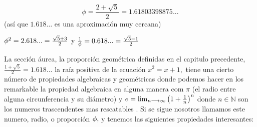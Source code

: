 $$\phi=\frac{2+\sqrt{5}}{2}=1.61803398875...$$
(así que $1.618\ldots $ es una aproximación  muy cercana)

$\phi^2=2.618...=\frac{\sqrt{5}+3}{2}$ y
$\frac{1}{\phi}=0.618...=\frac{\sqrt{5}-1}{2}$


La sección áurea, la proporción geométrica definidas en el capitulo precedente, $\frac{1+\sqrt{5}}{2}=1.618...$ la raíz positiva de la ecuación $x^2=x+1,$ tiene una cierto número de propiedades  algebraicas  y geométricas   donde podemos hacer en los remarkable la propiedad algebraica  en alguna manera  com $\pi$ (el radio entre alguna circunferencia y su diámetro) y $e=\lim_{n\longrightarrow \infty}\left(1+\frac{1}{n}\right)^n$ donde $n\in \mathbb{N}$ son los numeros trascendentes  mas rescatables  .
Si  se sigue nosotros llamamos este numero, radio, o proporción $\phi,$  y tenemos las siguientes propiedades interesantes:

